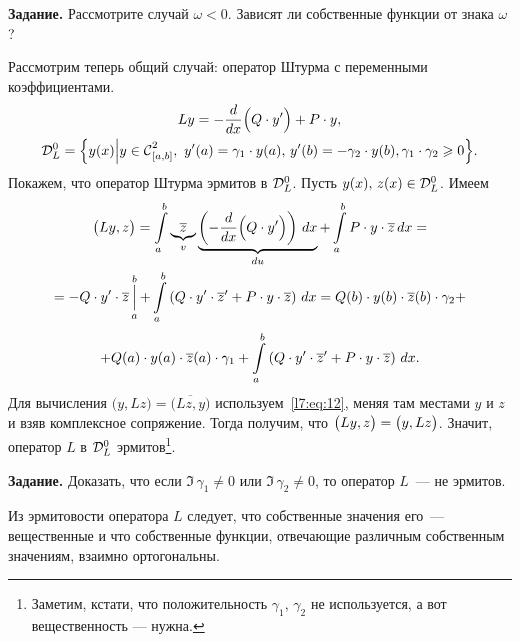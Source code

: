 \noindent\textbf{Задание.} Рассмотрите случай $\omega<0$. Зависят ли собственные функции от знака $\omega$?
\vspace{0.2cm}

Рассмотрим теперь общий случай: оператор Штурма с переменными коэффициентами.
\begin{multline*}
	Ly=-\der{}{x}\Big(Q\cdot y'\Big)+P\cdot y,\\\mc{D}_{L}^{0}=\Big\{y(x)\Big|y\in\Cfn[{[a,b]}]{2},\ y'(a)=\gamma_1\cdot y(a),\,y'(b)=-\gamma_2\cdot y(b), \gamma_1\cdot\gamma_2\geqslant0\Big\}.
\end{multline*}
Покажем, что оператор Штурма эрмитов в $\mc{D}_{L}^{0}$. Пусть $y(x),\,z(x)\in\mc{D}_{L}^{0}$. Имеем 
\begin{multline*}
	\big(Ly,z\big)=\int\limits_a^b\underbrace{\overline{z}}_{v}\underbrace{\left(-\der{}{x}\Big(Q\cdot y'\Big)\right)\,dx}_{du}+\int\limits_a^b P\cdot y\cdot\overline{z}\,dx=\\
	=-Q\cdot y'\cdot \overline{z}\mathop{\Big|}\limits_a^b+\int\limits_a^b\left(Q\cdot y'\cdot\overline{z}'+P\cdot y\cdot\overline{z}\right)\,dx=Q(b)\cdot y(b)\cdot\overline{z}(b)\cdot\gamma_2+\hfil	
\end{multline*}	
\begin{multline}
	\label{l7:eq:12}
	\hfill +Q(a)\cdot y(a)\cdot\overline{z}(a)\cdot\gamma_1+\int\limits_a^b\left(Q\cdot y'\cdot\overline{z}'+P\cdot y\cdot\overline{z}\right)\,dx.
\end{multline}
Для вычисления $\big(y,Lz\big)=\overline{\big(Lz,y\big)}$ используем~\eqref{l7:eq:12}, меняя там местами $y$ и $z$ и взяв комплексное сопряжение. Тогда получим, что $\big(Ly,z\big)\?=\big(y,Lz\big)$. Значит, оператор $L$ в $\mc{D}_{L}^{0}$ эрмитов\footnote{Заметим, кстати, что положительность $\gamma_1$, $\gamma_2$ не используется, а вот вещественность --- нужна.}.
\vspace{0.2cm}

\noindent\textbf{Задание.} Доказать, что если $\Im\,\gamma_1\neq0$ или $\Im\,\gamma_2\neq0$, то оператор $L$~--- не эрмитов.
\vspace{0.2cm}

Из эрмитовости оператора $L$ следует, что собственные значения его~--- вещественные и что собственные функции, отвечающие различным собственным значениям{\mb,} взаимно ортогональны.

